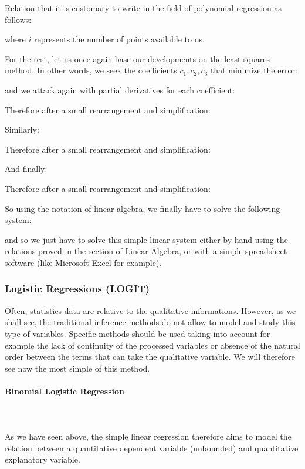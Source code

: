 	Relation that it is customary to write in the field of polynomial regression as follows:
	
	where $i$ represents the number of points available to us.
	
	For the rest, let us once again base our developments on the least squares method. In other words, we seek the coefficients $c_1,c_2,c_3$ that minimize the error:
	
	and we attack again with partial derivatives for each coefficient:
	
	Therefore after a small rearrangement and simplification:
	
	Similarly:
	
	Therefore after a small rearrangement and simplification:
	
	And finally:
	
	Therefore after a small rearrangement and simplification:
	
	So using the notation of linear algebra, we finally have to solve the following system:
	
	and so we just have to solve this simple linear system either by hand using the relations proved in the section of Linear Algebra, or with a simple spreadsheet software (like Microsoft Excel for example).
	
	\pagebreak
	\subsubsection{Logistic Regressions (LOGIT)}\label{logistic regression logit}
	Often, statistics data are relative to the qualitative informations. However, as we shall see, the traditional inference methods do not allow to model and study this type of variables. Specific methods should be used taking into account for example the lack of continuity of the processed variables or absence of the natural order between the terms that can take the qualitative variable.  We will therefore see now the most simple of this method.
	
	\paragraph{Binomial Logistic Regression}\mbox{}\\\\
	As we have seen above, the simple linear regression therefore aims to model the relation between a quantitative dependent variable (unbounded) and quantitative explanatory variable.
	
